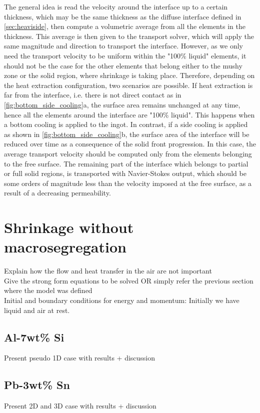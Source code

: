 The general idea is read the velocity around the interface up to a certain thickness, which may be the same 
thickness as the diffuse interface defined in \cref{sec:heaviside}, then compute a volumetric average
from all the elements in the thickness. This average is then given to the transport solver, which will apply
the same magnitude and direction to transport the interface. However, as we only need the transport velocity
to be uniform within the "100\% liquid" elements, it should not be the case for the other elements that belong 
either to the mushy zone or the solid region, where shrinkage is taking place.
Therefore, depending on the heat extraction configuration, two scenarios are possible. If heat extraction is far from
the interface, i.e. there is not direct contact as in \cref{fig:bottom_side_cooling}a, the surface area remains unchanged at any time, hence all the elements
around the interface are "100\% liquid". This happens when a bottom cooling is applied to the ingot. In contrast, if a side cooling 
is applied as shown in \cref{fig:bottom_side_cooling}b, the surface area of the interface will be reduced over time
as a consequence of the solid front progression. In this case, the average transport velocity should be computed only
from the elements belonging to the free surface. The remaining part of the interface which belongs to partial or full 
solid regions, is transported with Navier-Stokes output, which should be some orders of magnitude less than the velocity
imposed at the free surface, as a result of a decreasing permeability.

%
\section{Shrinkage without macrosegregation}
Explain how the flow and heat transfer in the air are not important \\ 
Give the strong form equations to be solved OR simply refer the previous section where the model was defined \\
Initial and boundary conditions for energy and momentum:  Initially we have liquid and air at rest. 
\subsection{Al-7wt\% Si}
Present pseudo 1D case with results + discussion
\subsection{Pb-3wt\% Sn}
Present 2D and 3D case with results + discussion
